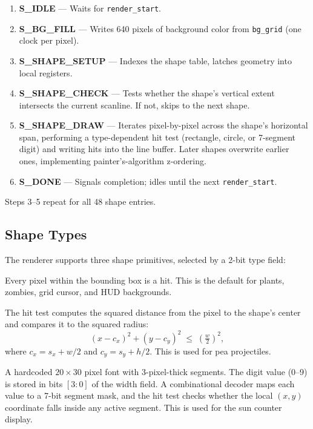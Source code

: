 \documentclass[11pt,letterpaper]{article}
\begin{document}
\begin{enumerate}[nosep]
  \item \textbf{S\_IDLE} --- Waits for \texttt{render\_start}.
  \item \textbf{S\_BG\_FILL} --- Writes 640 pixels of background color
    from \texttt{bg\_grid} (one clock per pixel).
  \item \textbf{S\_SHAPE\_SETUP} --- Indexes the shape table, latches
    geometry into local registers.
  \item \textbf{S\_SHAPE\_CHECK} --- Tests whether the shape's vertical
    extent intersects the current scanline. If not, skips to the next
    shape.
  \item \textbf{S\_SHAPE\_DRAW} --- Iterates pixel-by-pixel across the
    shape's horizontal span, performing a type-dependent hit test
    (rectangle, circle, or 7-segment digit) and writing hits into the
    line buffer. Later shapes overwrite earlier ones, implementing
    painter's-algorithm z-ordering.
  \item \textbf{S\_DONE} --- Signals completion; idles until the next
    \texttt{render\_start}.
\end{enumerate}

Steps 3--5 repeat for all 48 shape entries.

\subsection{Shape Types}
\label{sec:algo-shapes}

The renderer supports three shape primitives, selected by a 2-bit type
field:

\begin{description}[nosep, leftmargin=1.5cm, style=nextline]
  \item[Type 0 --- Filled Rectangle]
    Every pixel within the bounding box is a hit. This is the
    default for plants, zombies, grid cursor, and HUD backgrounds.

  \item[Type 1 --- Filled Circle]
    The hit test computes the squared distance from the pixel to the
    shape's center and compares it to the squared radius:
    \[
      (x - c_x)^2 + (y - c_y)^2 \;\leq\; \left(\tfrac{w}{2}\right)^2,
    \]
    where $c_x = s_x + w/2$ and $c_y = s_y + h/2$. This is used for pea
    projectiles.

  \item[Type 2 --- 7-Segment Digit]
    A hardcoded $20 \times 30$ pixel font with 3-pixel-thick segments.
    The digit value (0--9) is stored in bits $[3{:}0]$ of the width
    field. A combinational decoder maps each value to a 7-bit segment
    mask, and the hit test checks whether the local $(x, y)$ coordinate
    falls inside any active segment. This is used for the sun counter
    display.
\end{description}
\end{document}

